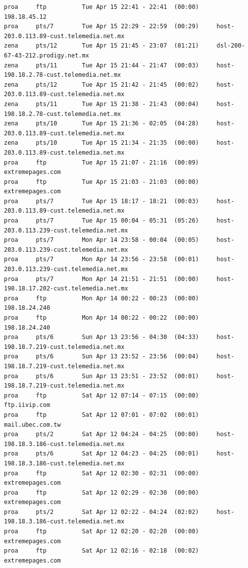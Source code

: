 \begin{lstlisting}[style=terminal]
proa     ftp          Tue Apr 15 22:41 - 22:41  (00:00)     198.18.45.12
proa     pts/7        Tue Apr 15 22:29 - 22:59  (00:29)     host-203.0.113.89-cust.telemedia.net.mx
zena     pts/12       Tue Apr 15 21:45 - 23:07  (01:21)     dsl-200-67-43-212.prodigy.net.mx
zena     pts/11       Tue Apr 15 21:44 - 21:47  (00:03)     host-198.18.2.78-cust.telemedia.net.mx
zena     pts/12       Tue Apr 15 21:42 - 21:45  (00:02)     host-203.0.113.89-cust.telemedia.net.mx
zena     pts/11       Tue Apr 15 21:38 - 21:43  (00:04)     host-198.18.2.78-cust.telemedia.net.mx
zena     pts/10       Tue Apr 15 21:36 - 02:05  (04:28)     host-203.0.113.89-cust.telemedia.net.mx
zena     pts/10       Tue Apr 15 21:34 - 21:35  (00:00)     host-203.0.113.89-cust.telemedia.net.mx
proa     ftp          Tue Apr 15 21:07 - 21:16  (00:09)     extremepages.com
proa     ftp          Tue Apr 15 21:03 - 21:03  (00:00)     extremepages.com
proa     pts/7        Tue Apr 15 18:17 - 18:21  (00:03)     host-203.0.113.89-cust.telemedia.net.mx
proa     pts/7        Tue Apr 15 00:04 - 05:31  (05:26)     host-203.0.113.239-cust.telemedia.net.mx
proa     pts/7        Mon Apr 14 23:58 - 00:04  (00:05)     host-203.0.113.239-cust.telemedia.net.mx
proa     pts/7        Mon Apr 14 23:56 - 23:58  (00:01)     host-203.0.113.239-cust.telemedia.net.mx
proa     pts/7        Mon Apr 14 21:51 - 21:51  (00:00)     host-198.18.17.202-cust.telemedia.net.mx
proa     ftp          Mon Apr 14 00:22 - 00:23  (00:00)     198.18.24.240
proa     ftp          Mon Apr 14 00:22 - 00:22  (00:00)     198.18.24.240
proa     pts/6        Sun Apr 13 23:56 - 04:30  (04:33)     host-198.18.7.219-cust.telemedia.net.mx
proa     pts/6        Sun Apr 13 23:52 - 23:56  (00:04)     host-198.18.7.219-cust.telemedia.net.mx
proa     pts/6        Sun Apr 13 23:51 - 23:52  (00:01)     host-198.18.7.219-cust.telemedia.net.mx
proa     ftp          Sat Apr 12 07:14 - 07:15  (00:00)     ftp.iivip.com
proa     ftp          Sat Apr 12 07:01 - 07:02  (00:01)     mail.ubec.com.tw
proa     pts/2        Sat Apr 12 04:24 - 04:25  (00:00)     host-198.18.3.186-cust.telemedia.net.mx
proa     pts/6        Sat Apr 12 04:23 - 04:25  (00:01)     host-198.18.3.186-cust.telemedia.net.mx
proa     ftp          Sat Apr 12 02:30 - 02:31  (00:00)     extremepages.com
proa     ftp          Sat Apr 12 02:29 - 02:30  (00:00)     extremepages.com
proa     pts/2        Sat Apr 12 02:22 - 04:24  (02:02)     host-198.18.3.186-cust.telemedia.net.mx
proa     ftp          Sat Apr 12 02:20 - 02:20  (00:00)     extremepages.com
proa     ftp          Sat Apr 12 02:16 - 02:18  (00:02)     extremepages.com

\end{lstlisting}
